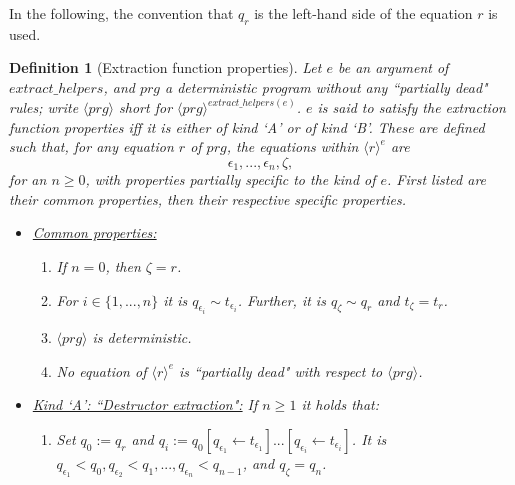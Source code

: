 \documentclass[11pt]{article} %
\newtheorem{definition}{Definition}
\begin{document}

In the following, the convention that $q_r$ is the left-hand side of the equation $r$ is used.

\begin{definition}[Extraction function properties]
Let $e$ be an argument of $extract\_helpers$, and $prg$ a deterministic program without any ``partially dead" rules; write $\langle prg \rangle$ short for $\langle prg \rangle^{extract\_helpers(e)}$. $e$ is said to satisfy the extraction function properties iff it is either of kind `A' or of kind `B'. These are defined such that, for any equation $r$ of $prg$, the equations within $\langle r \rangle^e$ are
\begin{equation*}
\epsilon_1, ..., \epsilon_n, \zeta,
\end{equation*}
for an $n \geq 0$, with properties partially specific to the kind of $e$. First listed are their common properties, then their respective specific properties.

\begin{itemize}
\item \underline{Common properties:}
\begin{enumerate}
\item If $n = 0$, then $\zeta = r$.
\item For $i \in \{1, ..., n\}$ it is $q_{\epsilon_i} \sim t_{\epsilon_i}$. Further, it is $q_\zeta \sim q_r$ and $t_\zeta = t_r$.
\item $\langle prg \rangle$ is deterministic.
\item No equation of $\langle r \rangle^e$ is ``partially dead" with respect to $\langle prg \rangle$.
\end{enumerate}

\item \underline{Kind `A': ``Destructor extraction":} If $n \geq 1$ it holds that:
\begin{enumerate}
\item Set $q_0 := q_r$ and $q_i := q_0[q_{\epsilon_1} \leftarrow t_{\epsilon_1}]...[q_{\epsilon_i} \leftarrow t_{\epsilon_i}]$. It is $q_{\epsilon_1} < q_0, q_{\epsilon_2} < q_1, ..., q_{\epsilon_n} < q_{n-1}$, and $q_\zeta = q_n$.
\end{enumerate}


\end{itemize}
\end{definition}
\end{document}
